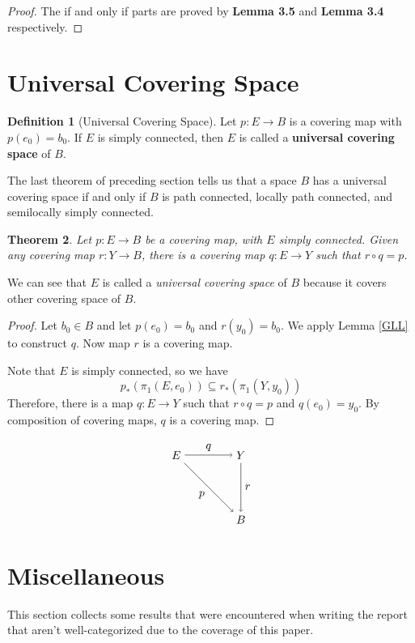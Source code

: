 \documentclass{amsart}
\newtheorem{theorem}{Theorem}[section]
\theoremstyle{definition}
\newtheorem{definition}[theorem]{Definition}
\theoremstyle{remark}
\numberwithin{equation}{section}
\begin{document}
\begin{proof}
    The if and only if parts are proved by \textbf{Lemma 3.5} and \textbf{Lemma 3.4} respectively.
\end{proof}

\section{Universal Covering Space}
\begin{definition}[Universal Covering Space] Let $p : E \to B$ is a covering map with $p(e_0) = b_0$. If $E$ is simply connected, then $E$ is called a \textbf{universal covering space} of $B$.
\end{definition}

The last theorem of preceding section tells us that a space $B$ has a universal covering space if and only if $B$ is path connected, locally path connected, and semilocally simply connected.

\begin{theorem} Let $p : E \to B$ be a covering map, with $E$ simply connected. Given any covering map $r : Y \to B$, there is a covering map $q : E \to Y$ such that $r \circ q = p$.
\end{theorem}
We can see that $E$ is called a \textit{universal covering space} of $B$ because it covers other covering space of $B$.

\begin{proof}
    Let $b_0 \in B$ and let $p(e_0) = b_0$ and $r(y_0) = b_0$. We apply Lemma \ref{GLL} to construct $q$. Now map $r$ is a covering map.

    Note that $E$ is simply connected, so we have
\[
p_\ast(\pi_1(E, e_0)) \subseteq r_\ast(\pi_1(Y, y_0))
\]
Therefore, there is a map $q : E \to Y$ such that $r \circ q = p$ and $q(e_0) = y_0$. By composition of covering maps, $q$ is a covering map.
\end{proof}

\[
\begin{tikzpicture}[node distance=2cm, auto]
  \node (E) {$E$};
  \node (Y) [right of=E] {$Y$};
  \node (B) [below of=Y] {$B$};

  \draw[->] (E) to node {$q$} (Y);
  \draw[->] (Y) to node {$r$} (B);
  \draw[->] (E) to node [swap] {$p$} (B);
\end{tikzpicture}
\]

\section{Miscellaneous}
This section collects some results that were encountered when writing the report that aren't well-categorized due to the coverage of this paper.
\end{document}
